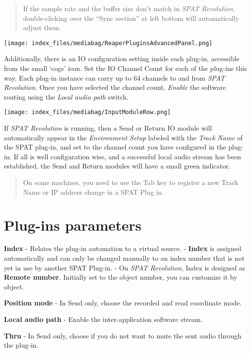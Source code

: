 \documentclass[
  letterpaper,
  DIV=11,
  numbers=noendperiod]{scrreport}
\begin{document}
\begin{quote}
If the sample rate and the buffer size don't match in \emph{SPAT
Revolution}, double-clicking over the ``Sync section'' at left bottom
will automatically adjust them.
\end{quote}

\texttt{[image: index\_files/mediabag/ReaperPluginsAdvancedPanel.png]}

Additionally, there is an IO configuration setting inside each plug-in,
accessible from the small `cogs' icon. Set the IO Channel Count for each
of the plug-ins this way. Each plug-in instance can carry up to 64
channels to and from \emph{SPAT Revolution}. Once you have selected the
channel count, \emph{Enable} the software routing using the \emph{Local
audio path} switch.

\texttt{[image: index\_files/mediabag/InputModuleRow.png]}

If \emph{SPAT Revolution} is running, then a Send or Return IO module
will automatically appear in the \emph{Environment Setup} labeled with
the \emph{Track Name} of the SPAT plug-in, and set to the channel count
you have configured in the plug-in. If all is well configuration wise,
and a successful local audio stream has been established, the Send and
Return modules will have a small green indicator.

\begin{quote}
On some machines, you need to use the Tab key to register a new Track
Name or IP address change in a SPAT Plug in.
\end{quote}

\hypertarget{plug-ins-parameters}{%
\section{Plug-ins parameters}\label{plug-ins-parameters}}

\textbf{Index} - Relates the plug-in automation to a virtual source. -
\textbf{Index} is assigned automatically and can only be changed
manually to an index number that is not yet in use by another SPAT
Plug-in. - On \emph{SPAT Revolution}, Index is designed as
\textbf{Remote number}. Initially set to the object number, you can
customize it by object.

\textbf{Position mode} - In Send only, choose the recorded and read
coordinate mode.

\textbf{Local audio path} - Enable the inter-application software
stream.

\textbf{Thru} - In Send only, choose if you do not want to mute the sent
audio through the plug-in.
\end{document}
